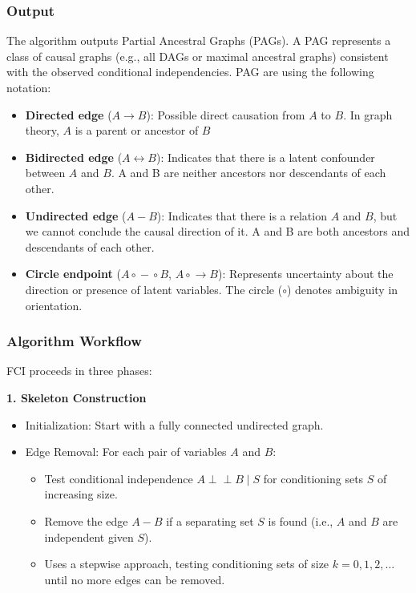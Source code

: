 \documentclass[main.tex]{subfiles}
\begin{document}
\subsubsection{Output}
The algorithm outputs Partial Ancestral Graphs (PAGs). A PAG represents a class of causal graphs (e.g., all DAGs or maximal ancestral graphs) consistent with the observed conditional independencies. PAG are using the following notation:
\begin{itemize}
        \item \textbf{Directed edge} ($A \rightarrow B$): Possible direct causation from $A$ to $B$. In graph theory, $A$ is a parent or ancestor of $B$
        \item \textbf{Bidirected edge} ($A \leftrightarrow B$): Indicates that there is a latent confounder between $A$ and $B$. A and B are neither ancestors nor descendants of each other.
        \item \textbf{Undirected edge} ($A - B$): Indicates that there is a relation $A$ and $B$, but we cannot conclude the causal direction of it. A and B are both ancestors and descendants of each other.
        \item \textbf{Circle endpoint} ($A \circ\!\!-\!\!\circ B$, $A \circ\!\!\rightarrow B$): Represents uncertainty about the direction or presence of latent variables. The circle ($\circ$) denotes ambiguity in orientation.
    \end{itemize}
    
\subsubsection{Algorithm Workflow}
FCI proceeds in three phases:

\textbf{1. Skeleton Construction}
\begin{itemize}
  \item Initialization: Start with a fully connected undirected graph.
  \item Edge Removal: For each pair of variables $A$ and $B$:
    \begin{itemize}
      \item Test conditional independence $A \perp\!\!\!\perp B \mid S$ for conditioning sets $S$ of increasing size.
      \item Remove the edge $A - B$ if a separating set $S$ is found (i.e., $A$ and $B$ are independent given $S$).
      \item Uses a stepwise approach, testing conditioning sets of size $k = 0, 1, 2, \dots$ until no more edges can be removed.
    \end{itemize}
\end{itemize}
\end{document}
